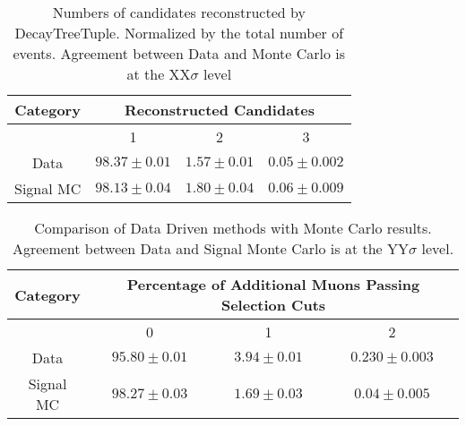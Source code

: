 \begin{table}[htdp]
	\begin{center}
		\begin{tabular}{c c c c}
		\hline
		Category & \multicolumn{3}{c}{Reconstructed Candidates} \\ \hline \hline
		 & 1 & 2 & 3 \\ \hline
		Data & $98.37\pm 0.01$& $1.57\pm 0.01$ & $0.05 \pm 0.002$ \\
		Signal MC & $98.13\pm 0.04$ & $1.80\pm 0.04$ & $0.06\pm 0.009$ \\
		\hline \hline
		\end{tabular}
	\end{center}
	\label{table:mc_data_ncand}
	\caption{Numbers of candidates reconstructed by DecayTreeTuple. Normalized by the total number of events. Agreement between Data and Monte Carlo is at the XX$\sigma$ level}
\end{table}

\begin{table}[htdp]
	\begin{center}
		\begin{tabular}{c c c c}
		\hline
		Category & \multicolumn{3}{c}{Percentage of Additional Muons Passing Selection Cuts} \\ \hline
		 & 0 & 1& 2 \\ \hline\hline
		Data & $95.80 \pm 0.01$& $3.94 \pm 0.01$ &$ 0.230\pm 0.003$ \\
		Signal MC & $98.27\pm 0.03$& $1.69\pm 0.03$& $0.04\pm 0.005$\\ \hline \hline
		\end{tabular}
	\end{center}
	\label{table:mc_vs_data}
	\caption{Comparison of Data Driven methods with Monte Carlo results. Agreement between Data and Signal Monte Carlo is at the YY$\sigma$ level.}
\end{table}%
